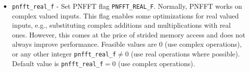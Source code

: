 \begin{itemize}
  \item \verb!pnfft_real_f! -
    Set PNFFT flag \verb!PNFFT_REAL_F!. Normally, PNFFT works on complex valued inputs. This flag enables some optimizations for real valued inputs, e.g., substituting complex additions and multiplications with real ones.
    However, this comes at the price of strided memory access and does not always improve performance.
    Feasible values are $0$ (use complex operations), or any other integer \verb!pnfft_real_f!$\ne0$ (use real operations where possible).
    Default value is \verb!pnfft_real_f!$=0$ (use complex operations).
\end{itemize}

